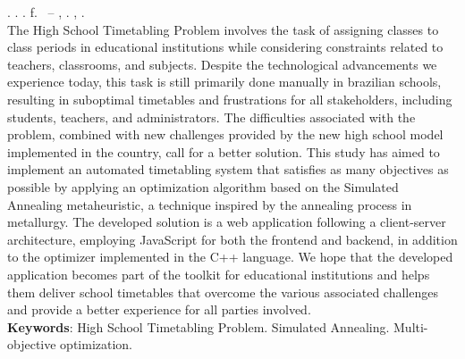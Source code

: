 
\begin{resumo}[ABSTRACT]
\begin{SingleSpacing}

\imprimirautorcitacao. \imprimirtitleabstract. \imprimirdata. \pageref {LastPage} f. \imprimirprojeto\ – \imprimirprograma, \imprimirinstituicao. \imprimirlocal, \imprimirdata.\\

The High School Timetabling Problem involves the task of assigning classes to class periods in educational institutions while considering constraints related to teachers, classrooms, and subjects. Despite the technological advancements we experience today, this task is still primarily done manually in brazilian schools, resulting in suboptimal timetables and frustrations for all stakeholders, including students, teachers, and administrators. The difficulties associated with the problem, combined with new challenges provided by the new high school model implemented in the country, call for a better solution. This study has aimed to implement an automated timetabling system that satisfies as many objectives as possible by applying an optimization algorithm based on the Simulated Annealing metaheuristic, a technique inspired by the annealing process in metallurgy. The developed solution is a web application following a client-server architecture, employing JavaScript for both the frontend and backend, in addition to the optimizer implemented in the C++ language. We hope that the developed application becomes part of the toolkit for educational institutions and helps them deliver school timetables that overcome the various associated challenges and provide a better experience for all parties involved.
\\

\textbf{Keywords}: High School Timetabling Problem. Simulated Annealing. Multi-objective optimization.

\end{SingleSpacing}
\end{resumo}

